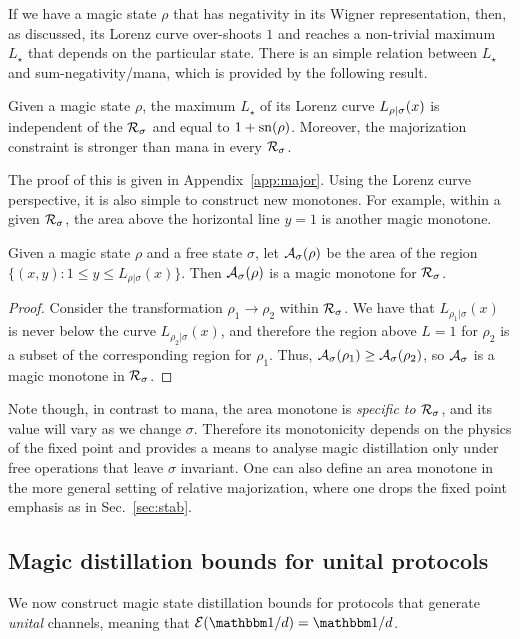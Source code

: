 \documentclass[pra,
aps,
twocolumn,
superscriptaddress,
groupedaddress,
nofootinbib,
reprint
]{revtex4-1}
\begin{document}
If we have a magic state $\rho$ that has negativity in its Wigner representation, then, as discussed, its Lorenz curve over-shoots $1$ and reaches a non-trivial maximum $L_\star$ that depends on the particular state. There is an simple relation between $L_\star$ and sum-negativity/mana, which is provided by the following result. 
\begin{theorem}\label{lem:lcmax}
	Given a magic state $\rho$, the maximum $L_\star$ of its Lorenz curve ${L_{\rho|\sigma}}(x)$ is independent of the ${\mathcal R}_\sigma$ and equal to $1+{{\rm{sn}}(\rho)}$. Moreover, the majorization constraint is stronger than mana in every ${\mathcal R}_\sigma$.
\end{theorem}
The proof of this is given in Appendix~\ref{app:major}. Using the Lorenz curve perspective, it is also simple to construct new monotones. For example, within a given ${\mathcal R}_\sigma$, the area above the horizontal line $y = 1$ is another magic monotone.
\begin{theorem}
Given a magic state $\rho$ and a free state $\sigma$, let ${\mathcal A}_\sigma(\rho)$ be the area of the region $\{(x, y): 1 \leq y \leq L_{\rho | \sigma}(x)\}$. Then ${\mathcal A}_\sigma(\rho)$ is a magic monotone for ${\mathcal R}_\sigma$.
\end{theorem}
\begin{proof}
Consider the transformation $\rho_1 \rightarrow \rho_2$ within ${\mathcal R}_\sigma$. We have that $L_{\rho_1|\sigma}(x)$ is never below the curve $L_{\rho_2|\sigma}(x)$, and therefore the region above $L=1$ for $\rho_2$ is a subset of the corresponding region for $\rho_1$. Thus, ${\mathcal A}_\sigma(\rho_1) \geq {\mathcal A}_\sigma(\rho_2)$, so ${\mathcal A}_\sigma$ is a magic monotone in ${\mathcal R}_\sigma$.
\end{proof}
Note though, in contrast to mana, the area monotone is \emph{specific to ${\mathcal R}_\sigma$}, and its value will vary as we change $\sigma$. Therefore its monotonicity depends on the physics of the fixed point and provides a means to analyse magic distillation only under free operations that leave $\sigma$ invariant. One can also define an area monotone in the more general setting of relative majorization, where one drops the fixed point emphasis as in Sec.~\ref{sec:stab}.

\subsection{Magic distillation bounds for unital protocols}
\label{sec:unital}

We now construct magic state distillation bounds for protocols that generate \emph{unital} channels, meaning that $\E(\I/d) = \I/d$.
\end{document}
